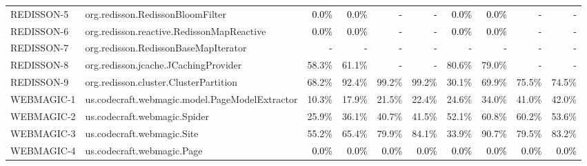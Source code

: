 \begin{tabular}{ ll rrrr rrrr}
REDISSON-5  &  org.redisson.RedissonBloomFilter & \cellcolor{light-gray} \textcolor{black}{0.0\%} & \cellcolor{light-gray} \textcolor{black}{0.0\%} & \cellcolor{light-gray} \textcolor{black}{-} & \cellcolor{light-gray} \textcolor{black}{-} & \cellcolor{light-gray} \textcolor{black}{0.0\%} & \cellcolor{light-gray} \textcolor{black}{0.0\%} & \cellcolor{light-gray} \textcolor{black}{-} & \cellcolor{light-gray} \textcolor{black}{-}\\ 
REDISSON-6  &  org.redisson.reactive.RedissonMapReactive & \cellcolor{light-gray} \textcolor{black}{0.0\%} & \cellcolor{light-gray} \textcolor{black}{0.0\%} & \cellcolor{light-gray} \textcolor{black}{-} & \cellcolor{light-gray} \textcolor{black}{-} & \cellcolor{light-gray} \textcolor{black}{0.0\%} & \cellcolor{light-gray} \textcolor{black}{0.0\%} & \cellcolor{light-gray} \textcolor{black}{-} & \cellcolor{light-gray} \textcolor{black}{-}\\ 
REDISSON-7  &  org.redisson.RedissonBaseMapIterator & \cellcolor{light-gray} \textcolor{black}{-} & \cellcolor{light-gray} \textcolor{black}{-} & \cellcolor{light-gray} \textcolor{black}{-} & \cellcolor{light-gray} \textcolor{black}{-} & \cellcolor{light-gray} \textcolor{black}{-} & \cellcolor{light-gray} \textcolor{black}{-} & \cellcolor{light-gray} \textcolor{black}{-} & \cellcolor{light-gray} \textcolor{black}{-}\\ 
REDISSON-8  &  org.redisson.jcache.JCachingProvider & 58.3\% & 61.1\% & \cellcolor{light-gray} \textcolor{black}{-} & \cellcolor{light-gray} \textcolor{black}{-} & 80.6\% & 79.0\% & \cellcolor{light-gray} \textcolor{black}{-} & \cellcolor{light-gray} \textcolor{black}{-}\\ 
REDISSON-9  &  org.redisson.cluster.ClusterPartition & 68.2\% & 92.4\% & 99.2\% & 99.2\% & 30.1\% & 69.9\% & 75.5\% & 74.5\%\\ 
WEBMAGIC-1  &  us.codecraft.webmagic.model.PageModelExtractor & 10.3\% & 17.9\% & 21.5\% & 22.4\% & 24.6\% & 34.0\% & 41.0\% & 42.0\%\\ 
WEBMAGIC-2  &  us.codecraft.webmagic.Spider & 25.9\% & 36.1\% & 40.7\% & 41.5\% & 52.1\% & 60.8\% & 60.2\% & 53.6\%\\ 
WEBMAGIC-3  &  us.codecraft.webmagic.Site & 55.2\% & 65.4\% & 79.9\% & 84.1\% & 33.9\% & 90.7\% & 79.5\% & 83.2\%\\ 
WEBMAGIC-4  &  us.codecraft.webmagic.Page & \cellcolor{light-gray} \textcolor{black}{0.0\%} & \cellcolor{light-gray} \textcolor{black}{0.0\%} & \cellcolor{light-gray} \textcolor{black}{0.0\%} & \cellcolor{light-gray} \textcolor{black}{0.0\%} & \cellcolor{light-gray} \textcolor{black}{0.0\%} & \cellcolor{light-gray} \textcolor{black}{0.0\%} & \cellcolor{light-gray} \textcolor{black}{0.0\%} & \cellcolor{light-gray} \textcolor{black}{0.0\%}\\ 

\end{tabular}
